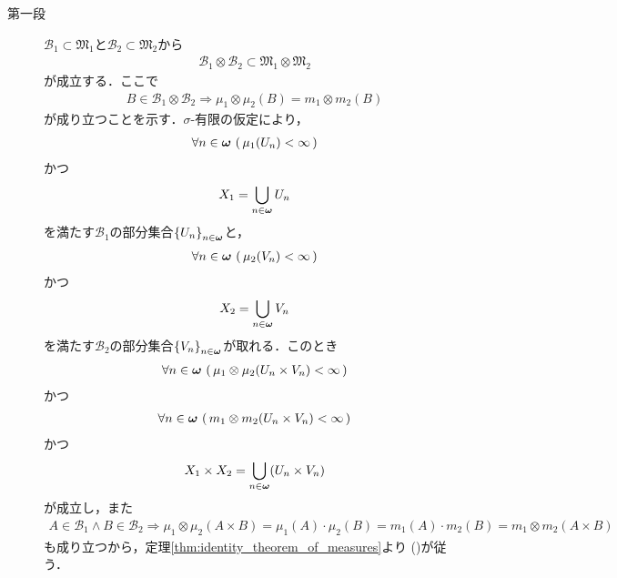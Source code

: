 		\begin{prf}\mbox{}
			\begin{description}
				\item[第一段]
					$\mathcal{B}_1 \subset \mathfrak{M}_1$と$\mathcal{B}_2 \subset \mathfrak{M}_2$から
					\begin{align}
						\mathcal{B}_1 \otimes \mathcal{B}_2 \subset \mathfrak{M}_1 \otimes \mathfrak{M}_2
					\end{align}
					が成立する．ここで
					\begin{align}
						B \in \mathcal{B}_1 \otimes \mathcal{B}_2 \Longrightarrow
						\mu_1 \otimes \mu_2(B) = m_1 \otimes m_2(B)
						\label{eq:thm_product_space_of_complete_measure_space_1}
					\end{align}
					が成り立つことを示す．$\sigma$-有限の仮定により，
					\begin{align}
						\forall n \in {\boldsymbol \omega}\, \left(\, \mu_1(U_n) < \infty\, \right)
					\end{align}
					かつ
					\begin{align}
						X_1 = \bigcup_{n \in {\boldsymbol \omega}} U_n
					\end{align}
					を満たす$\mathcal{B}_1$の部分集合$\left\{ U_n \right\}_{n \in {\boldsymbol \omega}}$と，
					\begin{align}
						\forall n \in {\boldsymbol \omega}\, \left(\, \mu_2(V_n) < \infty\, \right)
					\end{align}
					かつ
					\begin{align}
						X_2 = \bigcup_{n \in {\boldsymbol \omega}} V_n
					\end{align}
					を満たす$\mathcal{B}_2$の部分集合$\left\{ V_n \right\}_{n \in {\boldsymbol \omega}}$が取れる．このとき
					\begin{align}
						\forall n \in {\boldsymbol \omega}\, \left(\, \mu_1 \otimes \mu_2(U_n \times V_n) < \infty\, \right)
					\end{align}
					かつ
					\begin{align}
						\forall n \in {\boldsymbol \omega}\, \left(\, m_1 \otimes m_2(U_n \times V_n) < \infty\, \right)
					\end{align}
					かつ
					\begin{align}
						X_1 \times X_2 = \bigcup_{n \in {\boldsymbol \omega}} (U_n \times V_n)
					\end{align}
					が成立し，また
					\begin{align}
						A \in \mathcal{B}_1 \wedge B \in \mathcal{B}_2
						\Longrightarrow 
						\mu_1 \otimes \mu_2(A \times B) = \mu_1(A) \cdot \mu_2(B)
						= m_1(A) \cdot m_2(B)
						= m_1 \otimes m_2(A \times B)
					\end{align}
					も成り立つから，定理\ref{thm:identity_theorem_of_measures}より
					()が従う．
					

\end{description}
\end{prf}
